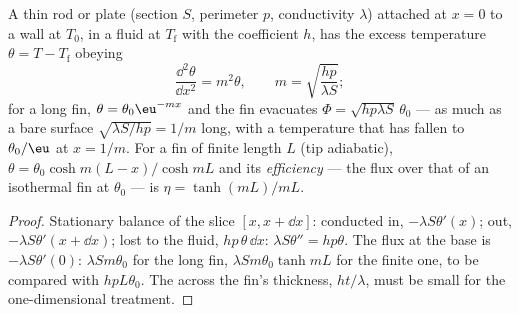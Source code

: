 \begin{proposition}\label{prop:b2:heat-conduction:fin}
A thin rod or plate (section $S$, perimeter $p$, conductivity $\lambda$)
attached at $x = 0$ to a wall at $T_0$, in a fluid at $T_{\text{f}}$ with
the coefficient $h$, has the excess temperature $\theta = T - T_{\text{f}}$
obeying
\[
\frac{\dd^2\theta}{\dd x^2} = m^2\theta, \qquad m = \sqrt{\frac{hp}{\lambda S}} ;
\]
for a long fin, $\theta = \theta_0\eu^{-mx}$ and the fin evacuates $\Phi =
\sqrt{hp\lambda S}\,\theta_0$ --- as much as a bare surface $\sqrt{\lambda
S/hp} = 1/m$ long, with a temperature that has fallen to $\theta_0/\eu$ at
$x = 1/m$. For a fin of finite length $L$ (tip adiabatic), $\theta =
\theta_0\cosh m(L-x)/\cosh mL$ and its \emph{efficiency} --- the flux over that of an isothermal fin at $\theta_0$ ---
is $\eta = \tanh(mL)/mL$.
\end{proposition}

\begin{proof}
Stationary balance of the slice $[x, x + \dd x]$: conducted in,
$-\lambda S\theta'(x)$; out, $-\lambda S\theta'(x + \dd x)$; lost to the
fluid, $hp\,\theta\,\dd x$: $\lambda S\theta'' = hp\theta$. The flux at the
base is $-\lambda S\theta'(0)$: $\lambda Sm\theta_0$ for the long fin,
$\lambda Sm\theta_0\tanh mL$ for the finite one, to be compared with
$hpL\theta_0$. The  across the fin's thickness, $ht/\lambda$, must
be small for the one-dimensional treatment.
\end{proof}

